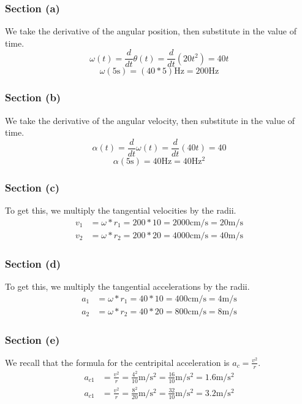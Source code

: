 \documentclass[12pt]{article}
\begin{document}
\subsubsection*{Section (a)}
We take the derivative of the angular position, then substitute in the value of time.
\[ \omega(t) = \frac{d}{dt}\theta(t) = \frac{d}{dt}(20t^2) = 40t \]
\[ \omega(5\unit{\second}) = (40*5) \unit{\hertz} = \boxed{200 \unit{\hertz}} \]

\subsubsection*{Section (b)}
We take the derivative of the angular velocity, then substitute in the value of time.
\[ \alpha(t) = \frac{d}{dt}\omega(t) = \frac{d}{dt}(40t) = 40 \]
\[ \alpha(5\unit{\second}) = 40 \unit{\hertz} = \boxed{40 \unit{\hertz^2}} \]

\subsubsection*{Section (c)}
To get this, we multiply the tangential velocities by the radii. 
\begin{align*}
    v_1 &=  \omega * r_1 = 200 * 10 = 2000\unit{\centi\meter/\second} = \boxed{20 \unit{\meter/\second}}\\
    v_2 &=  \omega * r_2 = 200 * 20 = 4000\unit{\centi\meter/\second} = \boxed{40 \unit{\meter/\second}}
\end{align*}

\subsubsection*{Section (d)}
To get this, we multiply the tangential accelerations by the radii. 
\begin{align*}
    a_1 &=  \omega * r_1 = 40 * 10 = 400\unit{\centi\meter/\second} = \boxed{4 \unit{\meter/\second}}\\
    a_2 &=  \omega * r_2 = 40 * 20 = 800\unit{\centi\meter/\second} = \boxed{8 \unit{\meter/\second}}
\end{align*}

\subsubsection*{Section (e)}
We recall that the formula for the centripital acceleration is $a_c = \frac{v^2}{r}$. 
\begin{align*}
    a_{c1}  &=  \frac{v^2}{r} = \frac{4^2}{10}\unit{\meter/\second^2} = \frac{16}{10}\unit{\meter/\second^2} = \boxed{1.6 \unit{\meter/\second^2}}\\
    a_{c1}  &=  \frac{v^2}{r} = \frac{8^2}{20}\unit{\meter/\second^2} = \frac{32}{10}\unit{\meter/\second^2} = \boxed{3.2 \unit{\meter/\second^2}}
\end{align*}
\end{document}
